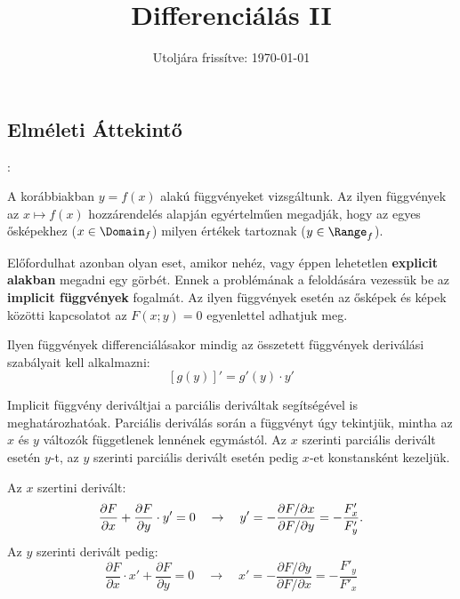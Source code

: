 \documentclass[a4paper, 12pt]{scrartcl}
\title{Differenciálás II}
\date{Utoljára frissítve: \today}
\begin{document}
\maketitle

\subsection{Elméleti Áttekintő}

\begin{blueBox}
  :

  A korábbiakban $y = f(x)$ alakú függvényeket vizsgáltunk. Az ilyen függvények
  az $x \mapsto f(x)$ hozzárendelés alapján egyértelműen megadják, hogy az egyes
  ősképekhez ($x \in \Domain_f$) milyen értékek tartoznak ($y \in \Range_f$).

  Előfordulhat azonban olyan eset, amikor nehéz, vagy éppen lehetetlen
  \textbf{explicit alakban} megadni egy görbét. Ennek a problémának a
  feloldására vezessük be az \textbf{implicit függvények} fogalmát. Az ilyen
  függvények esetén az ősképek és képek közötti kapcsolatot az $F(x; y) = 0$
  egyenlettel adhatjuk meg.

  Ilyen függvények differenciálásakor mindig az összetett függvények deriválási
  szabályait kell alkalmazni:
  \[
    \left[ g(y) \right]' = g'(y) \cdot y'
  \]
\end{blueBox}

\begin{note}
  Implicit függvény deriváltjai a parciális deriváltak segítségével is
  meghatározhatóak. Parciális deriválás során a függvényt úgy tekintjük, mintha
  az $x$ és $y$ változók függetlenek lennének egymástól. Az $x$ szerinti
  parciális derivált esetén $y$-t, az $y$ szerinti parciális derivált esetén
  pedig $x$-et konstansként kezeljük.

  Az $x$ szertini derivált:
  \[
    \frac{\partial F}{\partial x} + \frac{\partial F}{\partial y} \cdot y' = 0
    \quad \rightarrow \quad
    y' = -\frac{\partial F / \partial x}{\partial F / \partial y} = -\frac{F'_x}{F'_y}
    \text.
  \]
  Az $y$ szerinti derivált pedig:
  \[
    \frac{\partial F}{\partial x} \cdot x' + \frac{\partial F}{\partial y} = 0
    \quad \rightarrow \quad
    x' = -\frac{\partial F / \partial y}{\partial F / \partial x} = -\frac{F'_y}{F'_x}
  \]
\end{note}
\end{document}
